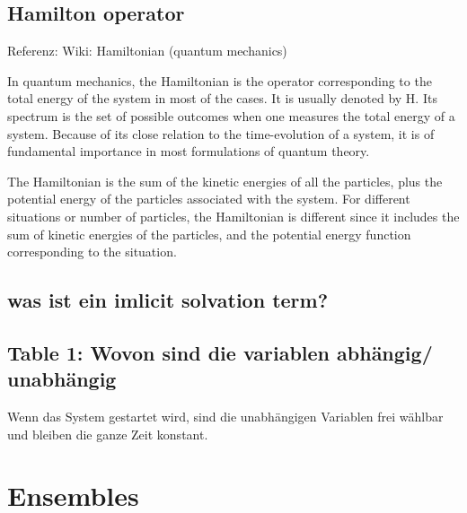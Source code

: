 \documentclass[]{article}
\begin{document}
\subsection{Hamilton operator}
Referenz: Wiki: Hamiltonian (quantum mechanics) 

In quantum mechanics, the Hamiltonian is the operator corresponding to the total energy of the system in most of the cases. It is usually denoted by H. Its spectrum is the set of possible outcomes when one measures the total energy of a system. Because of its close relation to the time-evolution of a system, it is of fundamental importance in most formulations of quantum theory.

The Hamiltonian is the sum of the kinetic energies of all the particles, plus the potential energy of the particles associated with the system. For different situations or number of particles, the Hamiltonian is different since it includes the sum of kinetic energies of the particles, and the potential energy function corresponding to the situation.

\subsection{was ist ein imlicit solvation term?}

\subsection{Table 1: Wovon sind die variablen abhängig/ unabhängig}
Wenn das System gestartet wird, sind die unabhängigen Variablen frei wählbar und bleiben die ganze Zeit konstant. 

\section{Ensembles}
\end{document}
